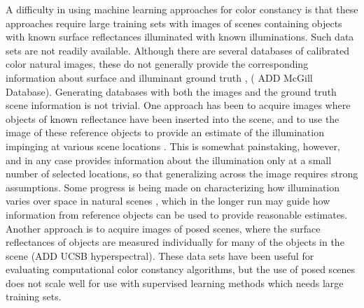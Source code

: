 \documentclass{jov}
\begin{document}
A difficulty in using machine learning approaches for color constancy is that these approaches require large training sets with images of scenes containing objects with known surface reflectances illuminated with known illuminations.  Such data sets are not readily available. Although there are several databases of calibrated color natural images, these do not generally provide the corresponding information about surface and illuminant ground truth \cite{ChakrabartiHyperspectral,NascimentoFoster2016,ParragaHyperspectralData,TkacikUpennHypersepctralData,skauli2013collection},  ( ADD McGill Database). Generating databases with both the images and the ground truth scene information is not trivial. One approach has been to acquire images where objects of known reflectance have been inserted into the scene, and to use the image of these reference objects to provide an estimate of the illumination impinging at various scene locations \cite{NascimentoFoster2016}.  This is somewhat painstaking, however, and in any case provides information about the illumination only at a small number of selected locations, so that generalizing across the image requires strong assumptions. Some progress is being made on characterizing how illumination varies over space in natural scenes \cite{mury2007spatial}, which in the longer run may guide how information from reference objects can be used to provide reasonable estimates.  Another approach is to acquire images of posed scenes, where the surface reflectances of objects are measured individually for many of the objects in the scene \cite{funt1988color,ciurea2003large} (ADD UCSB hyperspectral). These data sets have been useful for evaluating computational color constancy algorithms, but the use of posed scenes does not scale well for use with supervised learning methods which needs large training sets. 
 
\end{document}
